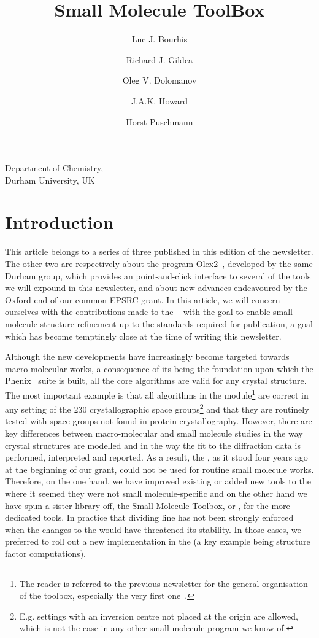 \documentclass[12pt]{article}
\title{Small Molecule ToolBox}
\author{Luc J. Bourhis \and Richard J. Gildea \and Oleg V. Dolomanov \and J.A.K. Howard \and Horst Puschmann}
\date{}
\begin{document}
\maketitle
\begin{center}
Department of Chemistry, \\
Durham University, UK
\end{center}

\section{Introduction}

This article belongs to a series of three published in this edition of the newsletter. The other two are respectively about the program Olex2~\cite{Dolomanov:2009}, developed by the same Durham group, which provides an point-and-click interface to several of the tools we will expound in this newsletter, and about new advances endeavoured by the Oxford end of our common EPSRC grant. In this article, we will concern ourselves with the contributions made to the \cctbx~\cite{cctbx} with the goal to enable small molecule structure refinement up to the standards required for publication, a goal which has become temptingly close at the time of writing this newsletter.

Although the \cctbx new developments have increasingly become targeted towards macro-molecular works, a consequence of its being the foundation upon which the Phenix~\cite{phenix} suite is built, all the core algorithms are valid for any crystal structure. The most important example is that all algorithms in the \cctbx module\footnote{The reader is referred to the previous \cctbx newsletter for the general organisation of the toolbox, especially the very first one~\cite{Grosse-Kunstleve:2003}.} are correct in any setting of the 230 crystallographic space groups\footnote{E.g. settings with an inversion centre not placed at the origin are allowed, which is not the case in any other small molecule program we know of.} and that they are routinely tested with space groups not found in protein crystallography. However, there are key differences between macro-molecular and small molecule studies in the way crystal structures are modelled and in the way the fit to the diffraction data is performed, interpreted and reported. As a result, the \cctbx, as it stood four years ago at the beginning of our grant, could not be used for routine small molecule works. Therefore, on the one hand, we have improved existing or added new tools to the \cctbx where it seemed they were not small molecule-specific and on the other hand we have spun a sister library off, the Small Molecule Toolbox, or \smtbx, for the more dedicated tools. In practice that dividing line has not been strongly enforced when the changes to the \cctbx would have threatened its stability. In those cases, we preferred to roll out a new implementation in the \smtbx (a key example being structure factor computations).
\end{document}
